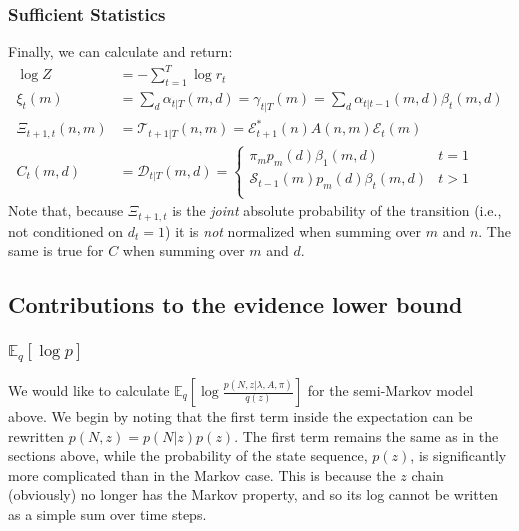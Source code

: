 \documentclass[11pt]{article}
\begin{document}
\subsubsection{Sufficient Statistics}
Finally, we can calculate and return:
\begin{align}
    \log Z &= - \sum_{t=1}^T \log r_t \\
    \xi_t(m) &= \sum_d \alpha_{t|T}(m,d) = \gamma_{t|T}(m) = \sum_d \alpha_{t|t-1}(m, d) \beta_t(m, d) \\
    \Xi_{t+1, t}(n, m) &= \mathcal{T}_{t+1|T}(n, m) = \mathcal{E}^*_{t+1}(n) A(n, m) \mathcal{E}_t(m) \\
    C_t(m, d) &= \mathcal{D}_{t|T}(m, d) =
    \begin{cases}
        \pi_m p_m(d) \beta_1(m, d) & t = 1 \\
        \mathcal{S}_{t-1}(m)p_m(d) \beta_t(m, d) & t > 1 \\
    \end{cases}
\end{align}
Note that, because $\Xi_{t+1, t}$ is the \emph{joint} absolute probability of the transition (i.e., not conditioned on $d_t = 1$) it is \emph{not} normalized when summing over $m$ and $n$. The same is true for $C$ when summing over $m$ and $d$.

\subsection{Contributions to the evidence lower bound}
\subsubsection{$\mathbb{E}_q[\log p]$}
We would like to calculate $\mathbb{E}_{q}\left[ \log \frac{p(N, z|\lambda, A, \pi)}{q(z)}\right]$ for the semi-Markov model above. We begin by noting that the first term inside the expectation can be rewritten $p(N, z) = p(N|z)p(z)$. The first term remains the same as in the sections above, while the probability of the state sequence, $p(z)$, is significantly more complicated than in the Markov case. This is because the $z$ chain (obviously) no longer has the Markov property, and so its log cannot be written as a simple sum over time steps.
\end{document}
